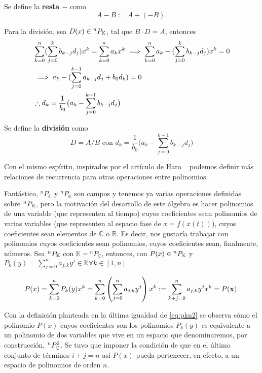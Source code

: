 Se define la \textbf{resta $-$} como
\begin{equation}
 A - B := A + (-B).
 \label{eq:polisub}
\end{equation}


Para la división, sea $D(x) \in {^{n}P_{\mathbb{K}}}$, tal que  $B \cdot D = A $,  entonces 
\begin{align*}
 & \sum_{k=0}^n  (\sum_{j=0}^k b_{k-j} d_j )  x^k = \sum_{k=0}^n  a_k  x^k \implies \sum_{k=0}^n  a_k - (\sum_{j=0}^k b_{k-j} d_j )  x^k = 0 \\ 
 &\implies a_k - ( \sum_{j=0}^{k-1}a_{k-j} d_j + b_0 d_k ) = 0 \\
 & \therefore d_k = \frac{1}{b_0} \big( a_k - \sum_{j=0}^{k-1} b_{k-j} d_j \big)  
\end{align*}

Se define la \textbf{división} como
\begin{equation}
 D = A/B \text{ con } d_k = \frac{1}{b_0} \big( a_k - \sum_{j=0}^{k-1} b_{k-j} d_j \big)
 \label{eq:polidiv}
\end{equation}

Con el mismo espíritu, inspirados por el artículo de Haro ~\cite{Haro2009} podemos definir más relaciones de recurrencia para otras operaciones entre polinomios.


Fantástico, $^nP_{\mathbb{C}}$ y $^nP_{\mathbb{R}}$ son campos y tenemos ya varias operaciones definidas sobre ${^{n}P_{\mathbb{K}}}$, pero la motivación del desarrollo de este álgebra es hacer polinomios de una variable (que representen al tiempo) cuyos coeficientes sean polinomios de varias variables (que representen al espacio fase de $\dot{x} = f(x(t))$), cuyos coeficientes sean elementos de $\mathbb{C}$ o $\mathbb{R}$. Es decir, nos gustaría trabajar con polinomios cuyos coeficientes sean polinomios, cuyos coeficientes sean, finalmente, números.
Sea  ${^{n}P_{\mathbb{K}}}$ con $\mathbb{K} = {{^{n}P_{\mathbb{C}}}}$, entonces, con $P(x) \in {^{n}P_{\mathbb{K}}}$ y $P_k(y) = \sum_{j=0}^n a_{j,k}y^j \in \mathbb{K} \forall k \in [1,n]$

\begin{equation}
 P(x) =  \sum_{k=0}^n P_k(y) x^k = \sum_{k=0}^n \left( \sum_{j=0}^n a_{j,k} y^j \right) x^k := \sum_{k+j=0}^n a_{j,k} y^j x^k = P(\mathbf{x}).
\label{eq:pkn2}
\end{equation}

Con la definición planteada en la última igualdad de \ref{eq:pkn2} se observa cómo el polinomio $P(x)$ cuyos coeficientes son los polinomios $P_k(y)$ es equivalente a un polinomio de dos variables que vive en un espacio que denominaremos, por construcción, ${^{n}P_{\mathbb{C}}^ 2 }$. Se tuvo que imponer la condición de que en el último conjunto de términos $i+j = n$ así $P(x)$  pueda pertenecer, en efecto, a un espacio de polinomios de orden $n$.

